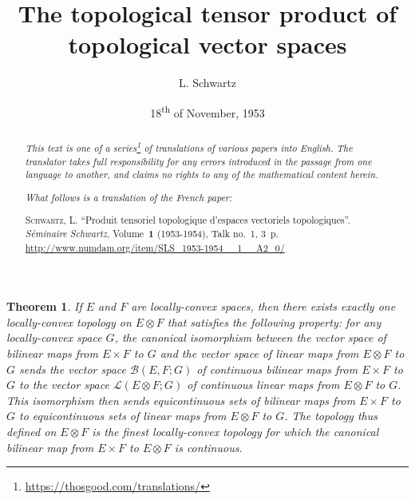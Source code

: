 \documentclass{article}
\title{The topological tensor product of topological vector spaces}
\author{L. Schwartz}
\date{18\textsuperscript{th} of November, 1953}
\theoremstyle{plain}
\newtheorem*{theorem}{Theorem}
\theoremstyle{definition}
\newcommand{\BB}{\mathcal{B}}
\newcommand{\LL}{\mathcal{L}}
\newcommand{\oldpage}[1]{\marginpar{\phantom{.}\\\footnotesize$\Big\vert$ \textit{p.~#1}}}
\begin{document}
\maketitle
\thispagestyle{fancy}

\renewcommand{\abstractname}{Translator's note.}

\begin{abstract}
  \renewcommand*{\thefootnote}{\fnsymbol{footnote}}
  \emph{This text is one of a series\footnote{\url{https://thosgood.com/translations/}} of translations of various papers into English.}
  \emph{The translator takes full responsibility for any errors introduced in the passage from one language to another, and claims no rights to any of the mathematical content herein.}
  
  \emph{What follows is a translation of the French paper:}

  \medskip\noindent
  \textsc{Schwartz, L.}
  ``Produit tensoriel topologique d'espaces vectoriels topologiques''.
  \emph{S\'{e}minaire Schwartz}, Volume~\textbf{1} (1953-1954), Talk no.~1, 3~p.
  {\footnotesize\url{http://www.numdam.org/item/SLS_1953-1954__1__A2_0/}}
\end{abstract}

\setcounter{footnote}{0}



\oldpage{1}
\begin{theorem}
  If $E$ and $F$ are locally-convex spaces, then there exists exactly one locally-convex topology on $E\otimes F$ that satisfies the following property:
  for any locally-convex space $G$, the canonical isomorphism between the vector space of bilinear maps from $E\times F$ to $G$ and the vector space of linear maps from $E\otimes F$ to $G$ sends the vector space $\BB(E,F;G)$ of continuous bilinear maps from $E\times F$ to $G$ to the vector space $\LL(E\otimes F;G)$ of continuous linear maps from $E\otimes F$ to $G$.
  This isomorphism then sends equicontinuous sets of bilinear maps from $E\times F$ to $G$ to equicontinuous sets of linear maps from $E\otimes F$ to $G$.
  The topology thus defined on $E\otimes F$ is the finest locally-convex topology for which the canonical bilinear map from $E\times F$ to $E\otimes F$ is continuous.
\end{theorem}
\end{document}
